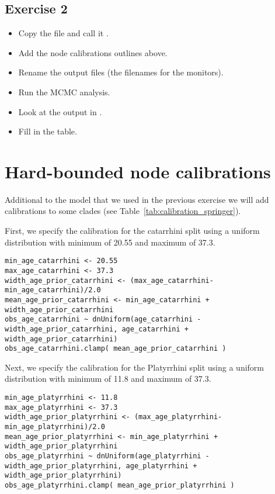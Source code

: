 \subsection{Exercise 2}

\begin{itemize}
\item Copy the file  and call it .
\item Add the node calibrations outlines above.
\item Rename the output files (\IE the filenames for the monitors).
\item Run the MCMC analysis.
\item Look at the output in \Tracer.
\item Fill in the table.
\end{itemize}




\newpage
\section{Hard-bounded node calibrations}\label{sec:HardBounds}
Additional to the model that we used in the previous exercise we will add calibrations to some clades (see Table~\ref{tab:calibration_springer}).

First, we specify the calibration for the catarrhini split using a uniform distribution with minimum of 20.55 and maximum of 37.3.
{\tt \begin{snugshade*}
\begin{lstlisting}
min_age_catarrhini <- 20.55
max_age_catarrhini <- 37.3
width_age_prior_catarrhini <- (max_age_catarrhini-min_age_catarrhini)/2.0
mean_age_prior_catarrhini <- min_age_catarrhini + width_age_prior_catarrhini
obs_age_catarrhini ~ dnUniform(age_catarrhini - width_age_prior_catarrhini, age_catarrhini + width_age_prior_catarrhini)
obs_age_catarrhini.clamp( mean_age_prior_catarrhini )
\end{lstlisting}
\end{snugshade*}}

Next, we specify the calibration for the Platyrrhini split using a uniform distribution with minimum of 11.8 and maximum of 37.3.
{\tt \begin{snugshade*}
\begin{lstlisting}
min_age_platyrrhini <- 11.8
max_age_platyrrhini <- 37.3
width_age_prior_platyrrhini <- (max_age_platyrrhini-min_age_platyrrhini)/2.0
mean_age_prior_platyrrhini <- min_age_platyrrhini + width_age_prior_platyrrhini
obs_age_platyrrhini ~ dnUniform(age_platyrrhini - width_age_prior_platyrrhini, age_platyrrhini + width_age_prior_platyrrhini)
obs_age_platyrrhini.clamp( mean_age_prior_platyrrhini )
\end{lstlisting}
\end{snugshade*}}

